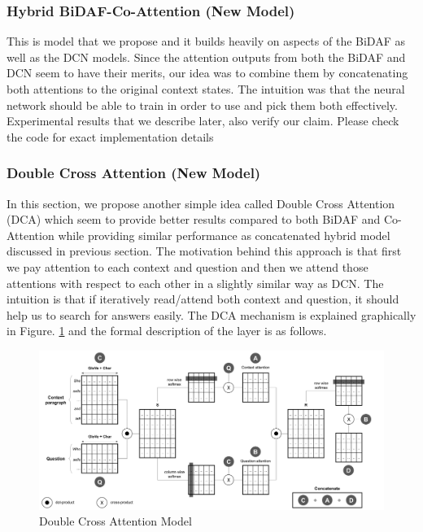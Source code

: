 \documentclass{article} %
\begin{document}
\subsubsection{Hybrid BiDAF-Co-Attention (New Model)}
This is model that we propose and it builds heavily on aspects of the BiDAF\cite{bidaf} as well as the DCN models\cite{coatten}.  Since the attention outputs from both the BiDAF and DCN seem to have their merits, our idea was to combine them by concatenating both attentions to the original context states. The intuition was that the neural network should be able to train in order to use and pick them both effectively. Experimental results that we describe later, also verify our claim. Please check the code for exact implementation details

\subsubsection{Double Cross Attention (New Model)}
In this section, we propose another simple idea called Double Cross Attention (DCA) which seem to provide better results compared to both BiDAF and Co-Attention while providing similar performance as concatenated hybrid model discussed in previous section. The motivation behind this approach is that first we pay attention to each context and question and then we attend those attentions with respect to each other in a slightly similar way as DCN. The intuition is that if iteratively read/attend both context and question, it should help us to search for answers easily. The DCA mechanism is explained graphically in Figure. \ref{fig:dca} and the formal description of the layer is as follows.
\begin{figure}
 \includegraphics[width=6.0in]{figures/model.png}
  \caption{Double Cross Attention Model}
  \label{fig:dca}
\end{figure}
\end{document}
